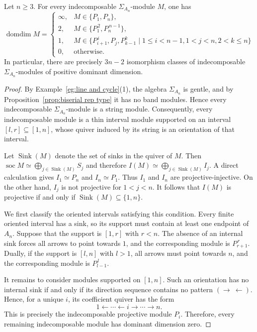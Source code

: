 \documentclass[a4paper,leqno]{amsart}
\begin{document}
\begin{prop}\label{prop:domdim-modules-An}
Let $n\geq3$. For every indecomposable $\Sigma_{A_n}$-module $M$, one has
\[
\operatorname{domdim}M=
\begin{cases}
\infty, & M\in\{ P_1, P_n\},\\
2,      & M\in\{ P_1^{\,2}, P_n^{\,n-1} \}, \\
1,      & M\in \{ P_{i+1}^{\,i}, P_j, P_{k-1}^k \mid 1\le i<n-1, 1<j<n, 2<k\le n \}\\
0,      & \text{otherwise}.
\end{cases}
\]
In particular, there are precisely $3n-2$ isomorphism classes of
indecomposable $\Sigma_{A_n}$-modules of positive dominant dimension.
\end{prop}

\begin{proof}
By Example~\ref{eg:line and cycle}(1), the algebra $\Sigma_{A_n}$ is
gentle, and by Proposition~\ref{prop:biserial rep type} it has no band modules. Hence every indecomposable $\Sigma_{A_n}$-module is a string module. Consequently, every indecomposable module
is a thin interval module supported on an interval $[l,r]\subseteq[1,n]$, whose quiver induced by its string is an orientation of that interval.

Let $\operatorname{Sink}(M)$ denote the set of sinks in the quiver of $M$. Then
$\operatorname{soc}M
 \simeq\bigoplus_{j\in\operatorname{Sink}(M)}S_j$
and therefore $I(M)\simeq
\bigoplus_{j\in\operatorname{Sink}(M)}I_j.$
A direct calculation gives $I_1\simeq P_n$ and $I_n\simeq P_1$.
Thus $I_1$ and $I_n$ are projective-injective. On the other hand,
$I_j$ is not projective for $1<j<n$. It follows that $I(M)$ is projective if and only if $\operatorname{Sink}(M)\subseteq\{1,n\}$.

We first classify the oriented intervals satisfying this condition.
Every finite oriented interval has a sink, so its support must contain at least one endpoint of $A_n$. Suppose that the support is $[1,r]$ with $r<n$. The absence of an internal sink forces all arrows to point towards $1$, and the corresponding module is $P_{r+1}^{\,r}$. Dually, if the support is $[l,n]$ with $l>1$, all arrows must point towards $n$, and the corresponding module is $P_{l-1}^{\,l}$.

It remains to consider modules supported on $[1,n]$. Such an
orientation has no internal sink if and only if its direction sequence contains no pattern $(\longrightarrow\ \longleftarrow)$.
Hence, for a unique $i$, its coefficient quiver has the form
\[
1\longleftarrow\cdots\longleftarrow i
 \longrightarrow\cdots\longrightarrow n.
\]
This is precisely the indecomposable projective module $P_i$.
Therefore, every remaining indecomposable module has dominant
dimension zero.


\end{proof}
\end{document}
